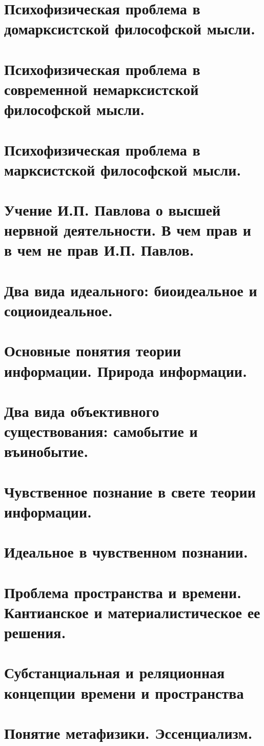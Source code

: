\section{ Психофизическая проблема в домарксистской философской мысли.}
\section{ Психофизическая проблема в современной немарксистской философской мысли.}
\section{ Психофизическая проблема в марксистской философской мысли.}
\section{ Учение И.П. Павлова о высшей нервной деятельности. В чем прав и в чем не прав И.П. Павлов.}
\section{ Два вида идеального: биоидеальное и социоидеальное.}
\section{ Основные понятия теории информации. Природа информации.}
\section{ Два вида объективного существования: самобытие и въинобытие.}
\section{ Чувственное познание в свете теории информации.}
\section{ Идеальное в чувственном познании.}
\section{ Проблема пространства и времени. Кантианское и материалистическое ее решения.}
\section{ Субстанциальная и реляционная концепции времени и пространства}
\section{ Понятие метафизики. Эссенциализм.}
